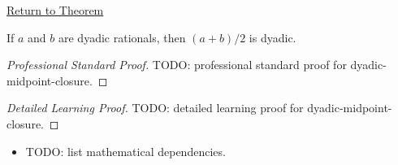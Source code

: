 \newpage
{}
\label{prf:dyadic-midpoint-closure}

\begin{remark*}[Return]
\hyperref[thm:dyadic-midpoint-closure]{Return to Theorem}
\end{remark*}

\begin{theorem*}
If $a$ and $b$ are dyadic rationals, then $(a+b)/2$ is dyadic.
\end{theorem*}

\begin{proof}[Professional Standard Proof]
\LRAProofBodyStart
TODO: professional standard proof for dyadic-midpoint-closure.
\end{proof}

\begin{proof}[Detailed Learning Proof]
\LRAProofBodyStart
TODO: detailed learning proof for dyadic-midpoint-closure.
\end{proof}

\begin{remark*}
\end{remark*}

\begin{dependencies}
\begin{itemize}
  \item TODO: list mathematical dependencies.
\end{itemize}
\end{dependencies}

\clearpage
